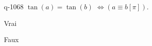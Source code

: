 \begin{truefalse}{q-1068}
$\tan(a)=\tan(b)$  $\Leftrightarrow \left(a\equiv b [\pi]\right)$.
\item* Vrai
\item Faux
\end{truefalse}

